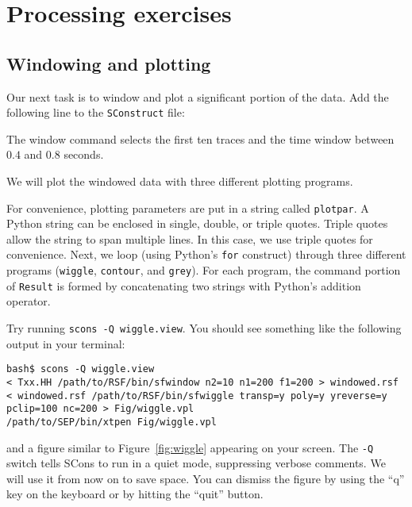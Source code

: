 \section{Processing exercises}

\subsection{Windowing and plotting}

Our next task is to window and plot a significant portion of the data. Add the
following line to the \texttt{SConstruct} file:



The window command selects the first ten traces and the time window between
$0.4$ and $0.8$ seconds.

We will plot the windowed data with three different plotting programs.



For convenience, plotting parameters are put in a string called
\texttt{plotpar}. A Python string can be enclosed in single, double,
or triple quotes. Triple quotes allow the string to span multiple
lines. In this case, we use triple quotes for convenience. Next, we
loop (using Python's \texttt{for} construct) through three different
programs (\texttt{wiggle}, \texttt{contour}, and \texttt{grey}). For
each program, the command portion of \texttt{Result} is formed by
concatenating two strings with Python's addition operator.

Try running \texttt{scons -Q wiggle.view}. You should see something like the
following output in your terminal:
\begin{verbatim}
bash$ scons -Q wiggle.view
< Txx.HH /path/to/RSF/bin/sfwindow n2=10 n1=200 f1=200 > windowed.rsf
< windowed.rsf /path/to/RSF/bin/sfwiggle transp=y poly=y yreverse=y 
pclip=100 nc=200 > Fig/wiggle.vpl
/path/to/SEP/bin/xtpen Fig/wiggle.vpl
\end{verbatim}
and a figure similar to Figure~\ref{fig:wiggle} appearing on your
screen. The \texttt{-Q} switch tells SCons to run in a quiet mode,
suppressing verbose comments. We will use it from now on to save
space. You can dismiss the figure by using the ``q'' key on the
keyboard or by hitting the ``quit'' button.

